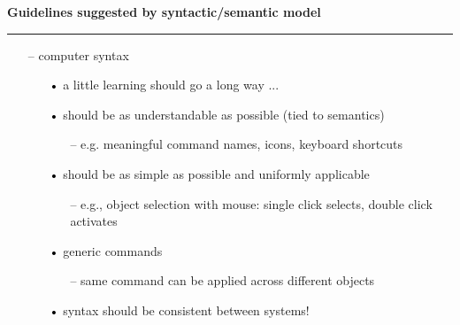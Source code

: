 \documentclass[pdf]{beamer}
\begin{document}
\begin{frame}
\vspace{8mm}
\textcolor{myBlue}{\textbf{\Large{Guidelines suggested by syntactic/semantic model}}}

\textcolor{red}{\rule{10cm}{1mm}}

\begin{small}

\begin{itemize}
\item [\textcolor{black}{--}]computer syntax
      \begin{itemize}
      \item [\textcolor{black}{•}]a little learning should go a long way ...
      \item [\textcolor{black}{•}] should be as understandable as possible (tied to semantics) 
            \begin{itemize}
            \item [\textcolor{black}{--}] e.g. meaningful command names, icons, keyboard shortcuts
            \end{itemize}
      \item [\textcolor{black}{•}] should be as simple as possible and uniformly applicable
            \begin{itemize}
            \item [\textcolor{black}{--}] e.g., object selection with mouse: single click selects, double click activates
            \end{itemize}
      \item [\textcolor{black}{•}] generic commands
            \begin{itemize}
            \item [\textcolor{black}{--}] same command can be applied across different objects
            \end{itemize}
      \item [\textcolor{black}{•}] syntax should be consistent between systems!
      \end{itemize}
\end{itemize}
\medskip
\end{small}
\end{frame}
\end{document}
